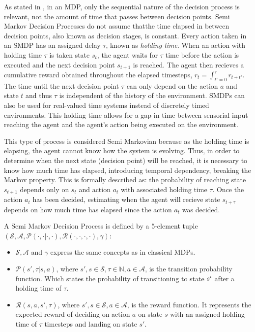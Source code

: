 \documentclass{../main.tex}{}
\begin{document}
As stated in \citep{Barto2003}, in an MDP, only the sequential nature of the decision process is relevant, not the amount of time that passes between decision points. Semi Markov Decision Processes do not assume thatthe time elapsed in between decision points, also known as decision stages, is constant. Every action taken in an SMDP has an assigned delay $\tau$, known as \textit{holding time}. When an action with holding time $\tau$ is taken state $s_t$, the agent waits for $\tau$ time before the action is executed and the next decision point $s_{t+1}$ is reached. The agent then recieves a cumulative reward obtained throughout the elapsed timesteps, $r_t = \int_{t'=0}^{\tau}r_{t+t'}$. The time until the next decision point $\tau$ can only depend on the action $a$ and state $t$ and thus $\tau$ is independent of the history of the environment. SMDPs can also be used for real-valued time systems instead of discretely timed environments. This holding time allows for a gap in time between sensorial input reaching the agent and the agent's action being executed on the environment.

This type of process is considered Semi Markovian because as the holding time is elapsing, the agent cannot know how the system is evolving. Thus, in order to determine when the next state (decision point) will be reached, it is necessary to know how much time has elapsed, introducing temporal dependency, breaking the Markov property. This is formally described as: the probability of reaching state $s_{t+1}$ depends only on $s_t$ and action $a_t$ with associated holding time $\tau$. Once the action $a_t$ has been decided, estimating when the agent will recieve state $s_{t+\tau}$ depends on how much time has elapsed since the action $a_t$ was decided.

A Semi Markov Decision Process is defined by a 5-element tuple $(\mathcal{S}, \mathcal{A}, \mathcal{P}(\cdot, \cdot | \cdot, \cdot), \mathcal{R}(\cdot, \cdot, \cdot, \cdot), \gamma)$:
\begin{itemize}
    \item $\mathcal{S}, \mathcal{A}$ and $\gamma$ express the same concepts as in classical MDPs.
    \item $\mathcal{P}(s', \tau | s, a)$, where $s',s \in \mathcal{S}, \tau \in \mathbb{N}, a \in \mathcal{A}$, is the transition probability function. Which states the probability of transitioning to state $s`$ after a holding time of $\tau$.
    \item $\mathcal{R}(s, a, s', \tau)$, where $s',s \in \mathcal{S}, a \in \mathcal{A}$, is the reward function. It represents the expected reward of deciding on action $a$ on state $s$ with an assigned holding time of $\tau$ timesteps and landing on state $s'$.
\end{itemize}
\end{document}
